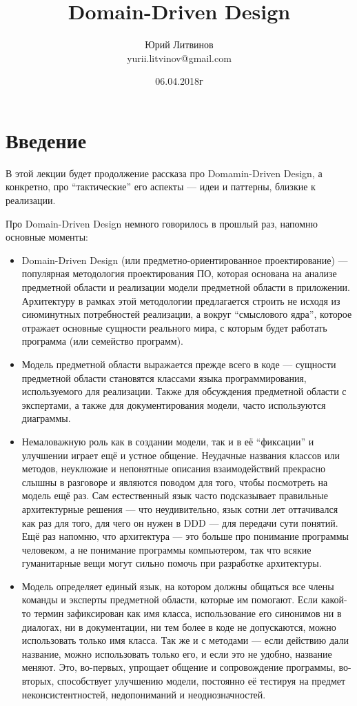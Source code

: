\documentclass[a5paper]{article}
\title{Domain-Driven Design}
\author{Юрий Литвинов\\\small{yurii.litvinov@gmail.com}}
\date{06.04.2018г}
\begin{document}
\maketitle
\thispagestyle{empty}

\section{Введение}

В этой лекции будет продолжение рассказа про Domamin-Driven Design, а конкретно, про ``тактические'' его аспекты --- идеи и паттерны, близкие к реализации.

Про Domain-Driven Design немного говорилось в прошлый раз, напомню основные моменты:

\begin{itemize}
    \item Domain-Driven Design (или предметно-ориентированное проектирование) --- популярная методология проектирования ПО, которая основана на анализе предметной области и реализации модели предметной области в приложении. Архитектуру в рамках этой методологии предлагается строить не исходя из сиюминутных потребностей реализации, а вокруг ``смыслового ядра'', которое отражает основные сущности реального мира, с которым будет работать программа (или семейство программ).
    \item Модель предметной области выражается прежде всего в коде --- сущности предметной области становятся классами языка программирования, используемого для реализации. Также для обсуждения предметной области с экспертами, а также для документирования модели, часто используются диаграммы.
    \item Немаловажную роль как в создании модели, так и в её ``фиксации'' и улучшении играет ещё и устное общение. Неудачные названия классов или методов, неуклюжие и непонятные описания взаимодействий прекрасно слышны в разговоре и являются поводом для того, чтобы посмотреть на модель ещё раз. Сам естественный язык часто подсказывает правильные архитектурные решения --- что неудивительно, язык сотни лет оттачивался как раз для того, для чего он нужен в DDD --- для передачи сути понятий. Ещё раз напомню, что архитектура --- это больше про понимание программы человеком, а не понимание программы компьютером, так что всякие гуманитарные вещи могут сильно помочь при разработке архитектуры.
    \item Модель определяет единый язык, на котором должны общаться все члены команды и эксперты предметной области, которые им помогают. Если какой-то термин зафиксирован как имя класса, использование его синонимов ни в диалогах, ни в документации, ни тем более в коде не допускаются, можно использовать только имя класса. Так же и с методами --- если действию дали название, можно использовать только его, и если это не удобно, название меняют. Это, во-первых, упрощает общение и сопровождение программы, во-вторых, способствует улучшению модели, постоянно её тестируя на предмет неконсистентностей, недопониманий и неоднозначностей.

\end{itemize}
\end{document}
